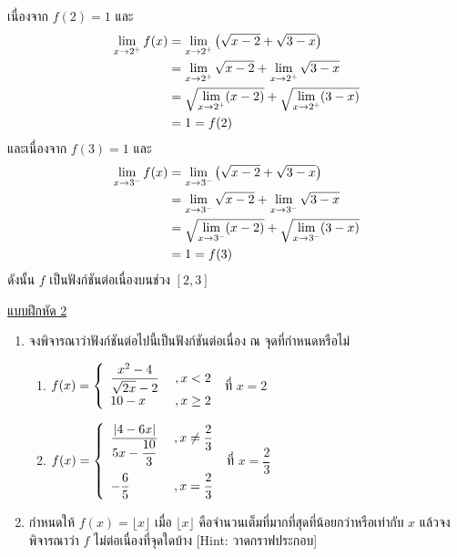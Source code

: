 \documentclass[hidelinks,12pt,a4paper]{article}
\makeatletter
\newcommand{\s}{\space}
\newcommand{\qed}{\scalebox{0.8}{$\blacksquare$}}
\newcommand{\Jitem}{%
  \refstepcounter{\@enumctr}%
  \item[%
    {\raisebox{-0ex}[0pt][0pt]{$\boldsymbol{\textcolor{magenta}{\mathbf{J}}^{\color{blue}{p}}}$}}%
    \,%
    \@nameuse{label\@enumctr}]%
}
\makeatother
\begin{document}
\hspace{15mm} เนื่องจาก $f(2) = 1$ และ
\begin{align*}
   \lim_{x\to2^{\scalebox{0.6}{$+$}}} f(x) & = \lim_{x\to2^{\scalebox{0.6}{$+$}}} \left( \sqrt{x-2}+\sqrt{3-x} \right) \\
   & = \lim_{x\to2^{\scalebox{0.6}{$+$}}}\sqrt{x-2}+\lim_{x\to2^{\scalebox{0.6}{$+$}}}\sqrt{3-x} \\
   & = \sqrt{\lim_{x\to2^{\scalebox{0.6}{$+$}}}(x-2)}+\sqrt{\lim_{x\to2^{\scalebox{0.6}{$+$}}}(3-x)} \\
   & = 1 = f(2)
\end{align*}
\hspace{15mm} และเนื่องจาก $f(3)=1$ และ
\begin{align*}
   \lim_{x\to3^{\scalebox{0.6}{$-$}}} f(x) & = \lim_{x\to3^{\scalebox{0.6}{$-$}}} \left( \sqrt{x-2}+\sqrt{3-x} \right) \\
   & = \lim_{x\to3^{\scalebox{0.6}{$-$}}}\sqrt{x-2}+\lim_{x\to3^{\scalebox{0.6}{$-$}}}\sqrt{3-x} \\
   & = \sqrt{\lim_{x\to3^{\scalebox{0.6}{$-$}}}(x-2)}+\sqrt{\lim_{x\to3^{\scalebox{0.6}{$-$}}}(3-x)} \\
   & = 1 = f(3)
\end{align*}
\hspace{15mm} ดังนั้น $f$ เป็นฟังก์ชันต่อเนื่องบนช่วง $[2,3]$ \hfill\qed

\newpage
\underline{\large แบบฝึกหัด 2}
\begin{enumerate}
    \item จงพิจารณาว่าฟังก์ชันต่อไปนี้เป็นฟังก์ชันต่อเนื่อง ณ จุดที่กำหนดหรือไม่
    \begin{enumerate}
        \renewcommand{\labelenumii}{\arabic{enumii})}
        \item $f(x) = \left\{ \begin{array}{ll}
        \dfrac{x^2-4}{\sqrt{2x}-2} & \hspace{0.8mm} ,x<2 \\[0.5ex]
        10-x &  \hspace{0.8mm} ,x\geq2
        \end{array} 
        \right.$ \hspace{1.5mm} ที่ $x=2$
        \vspace{55mm}
        \item $f(x) = \left\{ \begin{array}{ll}
        \dfrac{|4-6x|}{5x-\dfrac{10}{3}} &  \hspace{0.8mm} ,x\neq\dfrac{2}{3} \\[5ex]
        -\dfrac{6}{5} &  \hspace{0.8mm} ,x=\dfrac{2}{3}
        \end{array} 
        \right.$ \hspace{1.5mm} ที่ $x=\dfrac{2}{3}$
    \end{enumerate}
    \vspace{50mm}
    \Jitem กำหนดให้ $f(x)=\lfloor x \rfloor$ \s เมื่อ $\lfloor x \rfloor$ คือจำนวนเต็มที่มากที่สุดที่น้อยกว่าหรือเท่ากับ $x$ \s แล้วจงพิจารณาว่า $f$ ไม่ต่อเนื่องที่จุดใดบ้าง [Hint: วาดกราฟประกอบ]
\end{enumerate}
\end{document}
